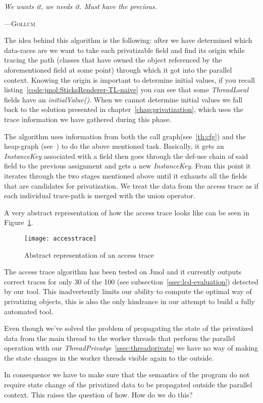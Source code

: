 \graphicspath{{content/accesstrace/figures/}}

\epigraph{\textit{We wants it, we needs it. Must have the precious.}}%
{---\textsc{Gollum}} 

The idea behind this algorithm is the following: after we have determined which
data-races are \slcds we want to take each privatizable field and find its
origin while tracing the path (classes that have owned the object referenced by
the aforementioned field at some point) through which it got into the parallel
context.
Knowing the origin is important to determine initial values, if you recall
listing~\ref{code:jmol:SticksRenderer-TL-naive} you can see that some
\emph{ThreadLocal} fields have an \emph{initialValue()}. When we cannot
determine initial values we fall back to the solution presented in
chapter~\ref{chap:privatization}, which uses the trace information we have
gathered during this phase.

The algorithm uses information from both the call graph(see~\ref{th:cfg}) and
the heap-graph (see~\cite{wala-heapgraph}) to do the above mentioned task.
Basically, it gets an \emph{InstanceKey} associated with a field then goes
through the def-use chain of said field to the previous assignment and gets a
new \emph{InstanceKey}. From this point it iterates through the two stages mentioned
above until it exhausts all the fields that are candidates for privatization. We
treat the data from the access trace as if each individual trace-path is merged
with the union operator.

A very abstract representation of how the access trace looks like can be seen
in Figure~\ref{fig:accesstrace}.

\begin{figure}[h]
	\begin{center}
		\texttt{[image: accesstrace]}
		\caption{Abstract representation of an access trace}
		\label{fig:accesstrace}
	\end{center}
\end{figure}

The access trace algorithm has been tested on Jmol and it currently outputs
correct traces for only 30 of the 100 \slcds(see
subsection~\ref{ssec:lcd-evaluation}) detected by our tool.
This inadvertently limits our ability to compute the optimal way of privatizing
objects, this is also the only hindrance in our attempt to build a fully
automated tool.

Even though we've solved the problem of propagating the state of the privatized
data from the main thread to the worker threads that perform the parallel
operation with our \emph{ThreadPrivatqe}~\ref{ssec:threadprivate} we have no way
of making the state changes in the worker threads visible again to the outside.

In consequence we have to make sure that the semantics of the program do not
require state change of the privatized data to be propagated outside the
parallel context. This raises the question of how. How do we do this?
